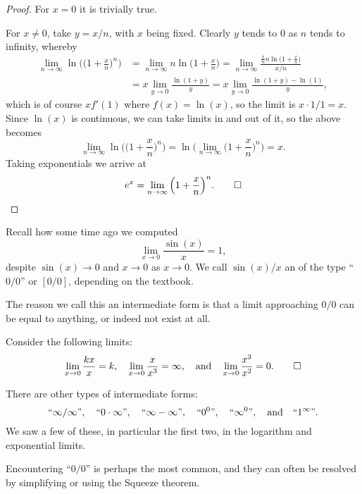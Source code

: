 \begin{proof}
	For $x = 0$ it is trivially true.

	For $x \neq 0$, take $y = x / n$, with $x$ being fixed.
	Clearly $y$ tends to $0$ as $n$ tends to infinity, whereby
	\begin{align*}
		\lim_{n \to \infty} \ln \Big ( \Big ( 1 + \frac{x}{n} \Big )^n \Big ) & = \lim_{n \to \infty} n \ln\Big ( 1 + \frac{x}{n} \Big ) = \lim_{n \to \infty} \frac{\frac{x}{n} n \ln \big ( 1 + \frac{x}{n} \big )}{x / n} \\
		                                                                      & = x \lim_{y \to 0} \frac{\ln(1 + y)}{y} = x \lim_{y \to 0} \frac{\ln(1 + y) - \ln(1)}{y},
	\end{align*}
	which is of course $x f'(1)$ where $f(x) = \ln(x)$, so the limit is $x \cdot 1/1 = x$.
	Since $\ln(x)$ is continuous, we can take limits in and out of it, so the above becomes
	\[
		\lim_{n \to \infty} \ln \Big ( \Big ( 1 + \frac{x}{n} \Big )^n \Big ) = \ln \Big ( \lim_{n \to \infty} \Big ( 1 + \frac{x}{n} \Big )^n \Big ) = x.
	\]
	Taking exponentials we arrive at
	\[
		e^x = \lim_{n \to \infty} \Big ( 1 + \frac{x}{n} \Big )^n. \qedhere
	\]
\end{proof}


Recall how some time ago we computed
\[
	\lim_{x \to 0} \frac{\sin(x)}{x} = 1,
\]
despite $\sin(x) \to 0$ and $x \to 0$ as $x \to 0$.
We call $\sin(x) / x$ an  of the type ``$0 / 0$'' or $[0 / 0]$, depending on the textbook.

The reason we call this an intermediate form is that a limit approaching $0 / 0$ can be equal to anything, or indeed not exist at all.

\begin{examples}
	Consider the following limits:
	\[
		\lim_{x \to 0} \frac{k x}{x} = k, \quad \lim_{x \to 0} \frac{x}{x^3} = \infty, \quad \text{and} \quad \lim_{x \to 0} \frac{x^3}{x^2} = 0. \qedhere
	\]
\end{examples}

\noindent
There are other types of intermediate forms:
\[
	``\infty / \infty ", \quad ``0 \cdot \infty", \quad ``\infty - \infty", \quad ``0^0", \quad ``\infty^0", \quad \text{and} \quad ``1^\infty".
\]
We saw a few of these, in particular the first two, in the logarithm and exponential limits.

Encountering ``$0 / 0$'' is perhaps the most common, and they can often be resolved by simplifying or using the Squeeze theorem.

